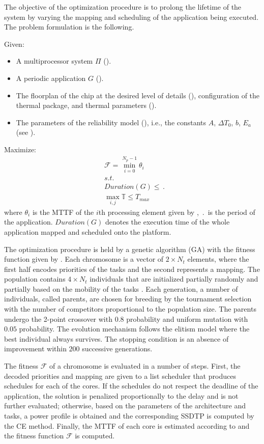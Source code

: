 The objective of the optimization procedure is to prolong the lifetime of the system by varying the mapping and scheduling of the application being executed. The problem formulation is the following.

Given:

\begin{itemize}
  \item A multiprocessor system $\Pi$ ().
  \item A periodic application $G$ ().
  \item The floorplan of the chip at the desired level of details (), configuration of the thermal package, and thermal parameters ().
  \item The parameters of the reliability model (), i.e., the constants $A$, $\Delta T_0$, $b$, $E_a$ (see ).
\end{itemize}

Maximize:
\begin{align}
  & \mathcal{F} = \min_{i = 0}^{N_p - 1} \theta_i \label{eq:fitness-function} \\
  & s.t. \nonumber \\
  & Duration(G) \leq \period \nonumber \\
  & \max_{i, j} \mathbb{T} \leq T_{max} \nonumber
\end{align}
where $\theta_i$ is the MTTF of the $i$th processing element given by , $\period$ is the period of the application. $Duration(G)$ denotes the execution time of the whole application mapped and scheduled onto the platform.

The optimization procedure is held by a genetic algorithm (GA) \cite{schmitz2004} with the fitness function given by . Each chromosome is a vector of $2 \times N_t$ elements, where the first half encodes priorities of the tasks and the second represents a mapping. The population contains $4 \times N_t$ individuals that are initialized partially randomly and partially based on the mobility of the tasks \cite{schmitz2004}. Each generation, a number of individuals, called parents, are chosen for breeding by the tournament selection with the number of competitors proportional to the population size. The parents undergo the 2-point crossover with $0.8$ probability and uniform mutation with $0.05$ probability. The evolution mechanism follows the elitism model where the best individual always survives. The stopping condition is an absence of improvement within $200$ successive generations.

The fitness $\mathcal{F}$ of a chromosome is evaluated in a number of steps. First, the decoded priorities and mapping are given to a list scheduler that produces schedules for each of the cores. If the schedules do not respect the deadline of the application, the solution is penalized proportionally to the delay and is not further evaluated; otherwise, based on the parameters of the architecture and tasks, a power profile is obtained and the corresponding SSDTP is computed by the CE method. Finally, the MTTF of each core is estimated according to  and the fitness function $\mathcal{F}$ is computed.
